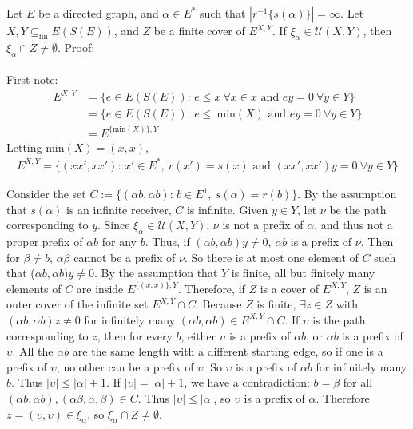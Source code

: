 \documentclass{article}
\begin{document}
Let $E$ be a directed graph, and $\alpha \in E^*$ such that $|r^{-1}\{s(\alpha)\}| = \infty$.
Let $X, Y \subseteq_{\text{fin}} E(S(E))$, and $Z$ be a finite cover of $E^{X, Y}$.
If $\xi_\alpha \in \mathcal{U}(X, Y)$, then $\xi_\alpha \cap Z \neq \emptyset$. Proof:
\\ \\
First note:
\begin{align*}
    E^{X, Y} &= \{ e \in E(S(E))\text{: } e \leq x \ \forall x \in x \text{ and } ey = 0 \ \forall y \in Y \} \\
             &= \{ e \in E(S(E))\text{: } e \leq \ \text{min}(X) \text{ and } ey = 0 \ \forall y \in Y \} \\
             &= E^{\{\text{min}(X)\}, Y}
\end{align*}
Letting min$(X) = (x, x)$,
\begin{align*}
    E^{X, Y} = \{ (xx', xx') \text{: } x' \in E^*, \ r(x') = s(x) \text{ and } (xx', xx')y = 0 \ \forall y \in Y \}
\end{align*}

Consider the set $C := \{ (\alpha b, \alpha b)\text{: } b \in E^1, \ s(\alpha) = r(b) \}$. By the assumption
that $s(\alpha)$ is an infinite receiver, $C$ is infinite. Given $y \in Y$, let $\nu$ be the path corresponding to $y$.
Since $\xi_\alpha \in \mathcal{U}(X, Y)$, $\nu$ is not a prefix of $\alpha$, and thus not a proper prefix of $\alpha b$ 
for any $b$. Thus, if $(\alpha b, \alpha b)y \neq 0$, $\alpha b$ is a prefix of $\nu$. Then for $\beta \neq b$, 
$\alpha \beta$ cannot be a prefix of $\nu$. So there is at most one element of $C$ such that ($\alpha b, \alpha b)y \neq 0$.
By the assumption that $Y$ is finite, all but finitely many elements of $C$ are inside $E^{\{(x, x)\}, Y}$. Therefore, if $Z$
is a cover of $E^{X, Y}$, $Z$ is an outer cover of the infinite set $E^{X, Y} \cap C$. Because $Z$ is finite, $\exists z \in Z$ 
with $(\alpha b, \alpha b)z \neq 0$ for infinitely many $(\alpha b, \alpha b) \in E^{X, Y} \cap C$. If $\upsilon$ is the path corresponding to $z$,
then for every $b$, either $\upsilon$ is a prefix of $\alpha b$, or $\alpha b$ is a prefix of $\upsilon$.
All the $\alpha b$ are the same length with a different starting edge, so if one is a prefix of $\upsilon$,
no other can be a prefix of $\upsilon$. So $\upsilon$ is a prefix of $\alpha b$ for infinitely many $b$. Thus $|\upsilon| \leq |\alpha| + 1$.
If $|\upsilon| = |\alpha| + 1$, we have a contradiction: $b = \beta$ for all $(\alpha b, \alpha b), (\alpha \beta, \alpha, \beta) \in C$.
Thus $|\upsilon| \leq |\alpha|$, so $\upsilon$ is a prefix of $\alpha$. Therefore $z = (\upsilon, \upsilon) \in \xi_\alpha$, so 
$\xi_\alpha \cap Z \neq \emptyset$.
\end{document}
